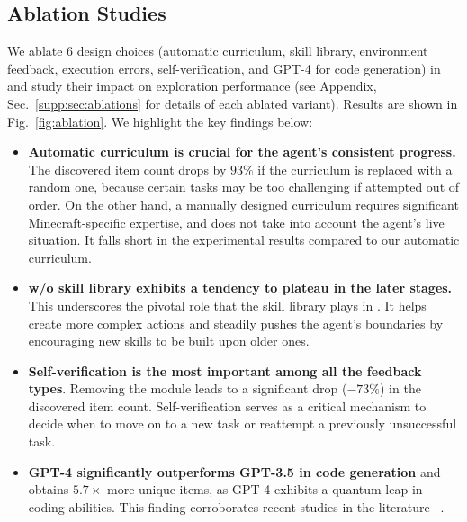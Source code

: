 \subsection{Ablation Studies}
We ablate 6 design choices (automatic curriculum, skill library, environment feedback, execution errors, self-verification, and GPT-4 for code generation) in \voyager and study their impact on exploration performance (see Appendix, Sec.~\ref{supp:sec:ablations} for details of each ablated variant). Results are shown in Fig.~\ref{fig:ablation}. We highlight the key findings below: 
\begin{itemize}
    \item \textbf{Automatic curriculum is crucial for the agent's consistent progress.} The discovered item count drops by $93\%$ if the curriculum is replaced with a random one, because certain tasks may be too challenging if attempted out of order. On the other hand, a manually designed curriculum requires significant Minecraft-specific expertise, and does not take into account the agent's live situation. It falls short in the experimental results compared to our automatic curriculum. 
    \item \textbf{\voyager w/o skill library exhibits a tendency to plateau in the later stages.} This underscores the pivotal role that the skill library plays in \voyager. It helps create more complex actions and steadily pushes the agent's boundaries by encouraging new skills to be built upon older ones. 
    \item \textbf{Self-verification is the most important among all the feedback types}. Removing the module leads to a significant drop ($-73\%$) in the discovered item count. Self-verification serves as a critical mechanism to decide when to move on to a new task or reattempt a previously unsuccessful task. 
    \item \textbf{GPT-4 significantly outperforms GPT-3.5 in code generation} and obtains $5.7 \times$ more unique items, as GPT-4 exhibits a quantum leap in coding abilities. This finding corroborates recent studies in the literature ~\cite{bubeck2023sparks,liu2023summary}. 
\end{itemize}




